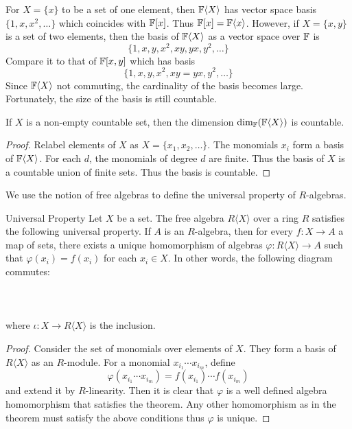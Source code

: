 \documentclass[a4paper]{article}
\begin{document}
For $X=\{x\}$ to be a set of one element, then $\mathbb{F}\langle X\rangle$ has vector space basis $\{1,x,x^2,\dots\}$ which coincides with $\mathbb{F}[x]$. Thus $\mathbb{F}[x]=\mathbb{F}\langle x\rangle$. However, if $X=\{x,y\}$ is a set of two elements, then the basis of $\mathbb{F}\langle X\rangle$ as a vector space over $\mathbb{F}$ is $$\{1,x,y,x^2,xy,yx,y^2,\dots\}$$ Compare it to that of $\mathbb{F}[x,y]$ which has basis $$\{1,x,y,x^2,xy=yx,y^2,\dots\}$$ Since $\mathbb{F}\langle X\rangle$ not commuting, the cardinality of the basis becomes large. Fortunately, the size of the basis is still countable. 

\begin{prp}{}{} If $X$ is a non-empty countable set, then the dimension $\dim_{\mathbb{F}}(\mathbb{F}\langle X\rangle)$ is countable. \tcbline
\begin{proof}
Relabel elements of $X$ as $X=\{x_1,x_2,\dots\}$. The monomials $x_i$ form a basis of $\mathbb{F}\langle X\rangle$. For each $d$, the monomials of degree $d$ are finite. Thus the basis of $X$ is a countable union of finite sets. Thus the basis is countable. 
\end{proof}
\end{prp}

We use the notion of free algebras to define the universal property of $R$-algebras. 

\begin{prp}{Universal Property}{} Let $X$ be a set. The free algebra $R\langle X\rangle$ over a ring $R$ satisfies the following universal property. If $A$ is an $R$-algebra, then for every $f:X\to A$ a map of sets, there exists a unique homomorphism of algebras $\varphi:R\langle X\rangle\to A$ such that $\varphi(x_i)=f(x_i)$ for each $x_i\in X$. In other words, the following diagram commutes: \\~\\
\\~\\
where $\iota:X\to R\langle X\rangle$ is the inclusion. \tcbline
\begin{proof}
Consider the set of monomials over elements of $X$. They form a basis of $R\langle X\rangle$ as an $R$-module. For a monomial $x_{i_1}\cdots x_{i_m}$, define $$\varphi(x_{i_1}\cdots x_{i_m})=f(x_{i_1})\cdots f(x_{i_m})$$ and extend it by $R$-linearity. Then it is clear that $\varphi$ is a well defined algebra homomorphism that satisfies the theorem. Any other homomorphism as in the theorem must satisfy the above conditions thus $\varphi$ is unique. 
\end{proof}
\end{prp}
\end{document}
